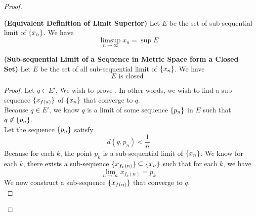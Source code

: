 \documentclass{report}
\begin{document}
\begin{proof}
\begin{corollary}
\label{4.3.9}
\textbf{(Equivalent Definition of Limit Superior)} Let $E$ be the set of sub-sequential limit of  $\{ x_n \}$. We have
\begin{equation}
\limsup_{n\to\infty} x_n=\sup E
\end{equation}
\end{corollary}
\begin{theorem}
\label{4.3.10}
\textbf{(Sub-sequential Limit of a Sequence in Metric Space form a Closed Set)} Let $E$ be the set of all sub-sequential limit of $\{ x_n \}$. We have
\begin{equation}
E\text{ is closed }
\end{equation}
\end{theorem}
\begin{proof}
Let $q\in E'$. We wish to prove . In other words, we wish to find a sub-sequence $\{ x_{f(n)} \}$ of $\{ x_n \}$ that converge to $q$.\\

Because $q\in E'$, we know $q$ is a limit of some sequence  $\{ p_n \}$ in $E$ such that $q\not\in \{ p_n \}$.\\

Let the sequence $\{ p_n \}$ satisfy 
\begin{equation}
d(q,p_n)<\frac{1}{n}
\end{equation}
Because for each $k$, the point $p_k$ is a sub-sequential limit of $\{ x_n \}$. We know for each $k$, there exists a sub-sequence $\{ x_{f_k(n)} \}\subseteq \{ x_n \}$ such that for each $k$, we have
\begin{equation}
\lim_{n\to\infty}x_{f_k(n)}= p_k
\end{equation}
We now construct a sub-sequence $\{ x_{f(n)} \}$ that converge to $q$.\\


\end{proof}
\end{proof}
\end{document}
